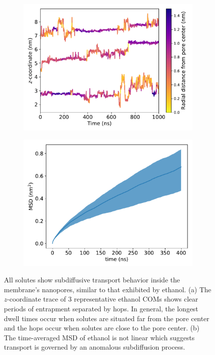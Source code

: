 \documentclass{article}
\begin{document}
  \begin{figure}
  \centering
  \begin{subfigure}{0.49\textwidth}
  \includegraphics[width=\linewidth]{colorful_example_ztraces.pdf}
  \caption{}\label{fig:example_ztraces}
  \end{subfigure}
  \begin{subfigure}{0.49\textwidth}
  \includegraphics[width=\linewidth]{example_msd.pdf}
  \caption{}\label{fig:example_msd}
  \end{subfigure}
  \caption{All solutes show subdiffusive transport behavior inside the membrane's
  nanopores, similar to that exhibited by ethanol. (a) The $z$-coordinate trace of
  3 representative ethanol COMs shows clear periods of entrapment separated by hops.
  In general, the longest dwell times occur when solutes are situated far from the
  pore center and the hops occur when solutes are close to the pore center. (b) The
  time-averaged MSD of ethanol is not linear which suggests transport is governed 
  by an anomalous subdiffusion process.}\label{fig:qualitative_mechanisms}
  \end{figure}
  
\end{document}
